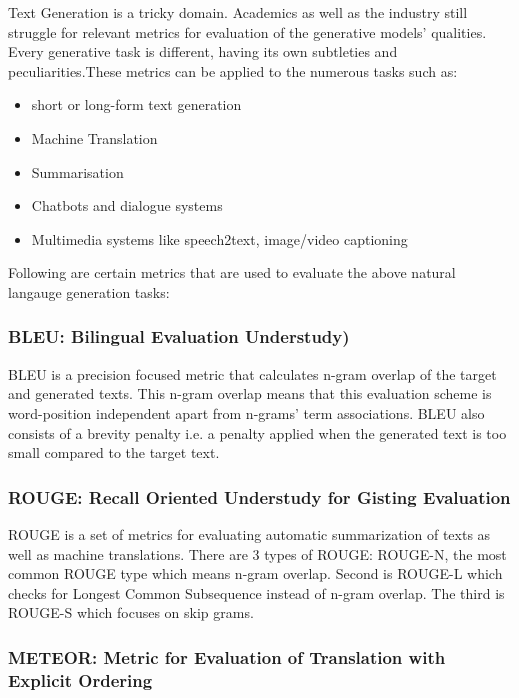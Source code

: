 Text Generation is a tricky domain. Academics as well as the industry still struggle for relevant metrics for evaluation of the generative models' qualities. Every generative task is different, having its own subtleties and peculiarities.These metrics can be applied to the numerous tasks such as:
\begin{itemize}
	\item short or long-form text generation
	\item Machine Translation
	\item Summarisation
	\item Chatbots and dialogue systems
	\item Multimedia systems like speech2text, image/video captioning
\end{itemize}
Following are certain metrics that are used to evaluate the above natural langauge generation tasks:

\subsubsection{BLEU: Bilingual Evaluation Understudy)}

\par BLEU \cite{bleu} is a precision focused metric that calculates n-gram overlap of the target and generated texts. This n-gram overlap means that this evaluation scheme is word-position independent apart from n-grams' term associations. BLEU also consists of a brevity penalty i.e. a penalty applied when the generated text is too small compared to the target text.


\subsubsection{ROUGE: Recall Oriented Understudy for Gisting Evaluation}

\par ROUGE \cite{rouge} is a set of metrics for evaluating automatic summarization of texts as well as machine translations. There are 3 types of ROUGE: ROUGE-N, the most common ROUGE type which means n-gram overlap. Second is ROUGE-L which checks for Longest Common Subsequence instead of n-gram overlap. The third is ROUGE-S which focuses on skip grams.


\subsubsection{METEOR: Metric for Evaluation of Translation with Explicit Ordering}

